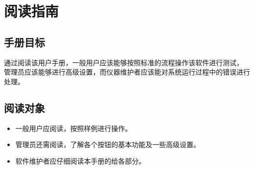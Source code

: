 \chapter{阅读指南}
\section{手册目标}
通过阅读该用户手册，一般用户应该能够按照标准的流程操作该软件进行测试，
管理员应该能够进行高级设置，而仪器维护者应该能对系统运行过程中的错误进行处理。
\section{阅读对象}

\begin{itemize}
    \item 一般用户应阅读，按照样例进行操作。
    \item 管理员还需阅读，了解各个按钮的基本功能及一些高级设置。
    \item 软件维护者应仔细阅读本手册的给各部分。
\end{itemize}


